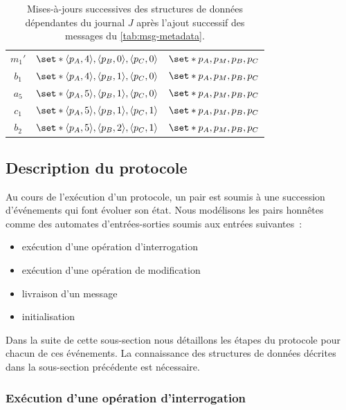 \begin{table}[ht]
\begin{subtable}{\linewidth}
\begin{tabular}{ccc}
        $m_1'$ & $\set*{\tuple*{p_A, 4}, \tuple*{p_B, 0}, \tuple*{p_C, 0}}$ & $\set*{p_A,p_M,p_B,p_C}$ \\
        $b_1$ & $\set*{\tuple*{p_A, 4}, \tuple*{p_B, 1}, \tuple*{p_C, 0}}$ & $\set*{p_A,p_M,p_B,p_C}$ \\
        $a_5$ & $\set*{\tuple*{p_A, 5}, \tuple*{p_B, 1}, \tuple*{p_C, 0}}$ & $\set*{p_A,p_M,p_B,p_C}$ \\
        $c_1$ & $\set*{\tuple*{p_A, 5}, \tuple*{p_B, 1},\tuple*{p_C, 1}}$ & $\set*{p_A,p_M,p_B,p_C}$ \\
        $b_2$ & $\set*{\tuple*{p_A, 5}, \tuple*{p_B, 2}, \tuple*{p_C, 1}}$ & $\set*{p_A,p_M,p_B,p_C}$ \\
    \end{tabular}
    \end{subtable}
    \caption[Exemple de mises-à-jour de structures de données dépendantes d'un journal]{Mises-à-jours successives des structures de données dépendantes du journal $J$ après l'ajout successif des messages du \autoref{tab:msg-metadata}.}\label{tab:data-structure-update}
\end{table}
 

\subsection{Description du protocole}\label{subsec:full-log-protocol-desc}

Au cours de l'exécution d'un protocole, un pair est soumis à une succession d'événements qui font évoluer son état.
Nous modélisons les pairs honnêtes comme des automates d'entrées-sorties soumis aux entrées suivantes~:
\begin{itemize}
    \item exécution d'une opération d'interrogation
    \item exécution d'une opération de modification
    \item livraison d'un message
    \item initialisation
\end{itemize}

Dans la suite de cette sous-section nous détaillons les étapes du protocole pour chacun de ces événements.
La connaissance des structures de données décrites dans la sous-section précédente est nécessaire.

\subsubsection{Exécution d'une opération d'interrogation}

